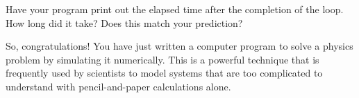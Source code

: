 \documentclass[11pt]{article}
\begin{document}
{Have your program print out the elapsed time after the completion of the
loop.  How long did it take?  Does this match your prediction?

So, congratulations!  You have just written a computer program to solve
a physics problem by simulating it numerically.  This is a powerful technique 
that is frequently used by scientists to model systems that are too 
complicated to understand with pencil-and-paper calculations alone.

}
\end{document}
